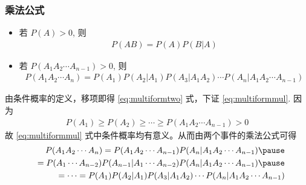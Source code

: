 \begin{frame}
	\frametitle{乘法公式}
	\begin{thm}[乘法公式]
		\begin{itemize}[<+-|alert@+>]
			\item 若 $P (A)>0$, 则 %
			\begin{eqnarray}
				\label{eq:multiformtwo}
				P(AB)=P(A)P(B|A)
			\end{eqnarray}
			\item 若 $P (A_1A_2\cdots A_{n-1})>0$, 则
			\begin{eqnarray}
				\label{eq:multiformmul}
				P(A_1A_2\cdots A_n)=P(A_1)P(A_2|A_1)P(A_3|A_1A_2)\cdots P(A_n|A_1A_2\cdots A_{n-1})
			\end{eqnarray}

		\end{itemize}
	\end{thm}
	\pause \zheng  由条件概率的定义，移项即得 \eqref{eq:multiformtwo} 式，下证 \eqref{eq:multiformmul}. \pause 因为
	\begin{eqnarray*}
		P(A_1)\ge P(A_2)\ge\cdots\ge P(A_1A_2\cdots A_{n-1})>0
	\end{eqnarray*}
	故 \eqref{eq:multiformmul} 式中条件概率均有意义。从而由两个事件的乘法公式可得
	\pause \begin{eqnarray*}
		&&P(A_1A_2\cdots A_n)=P(A_1A_2\cdots A_{n-1})P(A_n|A_1A_2\cdots A_{n-1})\pause \\
		&&=P(A_1\cdots A_{n-2})P(A_{n-1}|A_1\cdots A_{n-2})P(A_n|A_1A_2\cdots A_{n-1})\pause \\
		&&=\cdots =P(A_1)P(A_2|A_1)P(A_3|A_1A_2)\cdots P(A_n|A_1A_2\cdots A_{n-1})
	\end{eqnarray*}

\end{frame}



